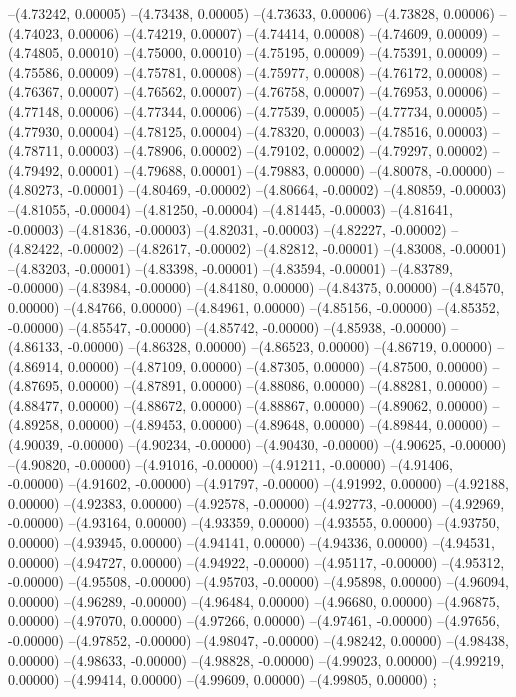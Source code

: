 --(4.73242, 0.00005)
--(4.73438, 0.00005)
--(4.73633, 0.00006)
--(4.73828, 0.00006)
--(4.74023, 0.00006)
--(4.74219, 0.00007)
--(4.74414, 0.00008)
--(4.74609, 0.00009)
--(4.74805, 0.00010)
--(4.75000, 0.00010)
--(4.75195, 0.00009)
--(4.75391, 0.00009)
--(4.75586, 0.00009)
--(4.75781, 0.00008)
--(4.75977, 0.00008)
--(4.76172, 0.00008)
--(4.76367, 0.00007)
--(4.76562, 0.00007)
--(4.76758, 0.00007)
--(4.76953, 0.00006)
--(4.77148, 0.00006)
--(4.77344, 0.00006)
--(4.77539, 0.00005)
--(4.77734, 0.00005)
--(4.77930, 0.00004)
--(4.78125, 0.00004)
--(4.78320, 0.00003)
--(4.78516, 0.00003)
--(4.78711, 0.00003)
--(4.78906, 0.00002)
--(4.79102, 0.00002)
--(4.79297, 0.00002)
--(4.79492, 0.00001)
--(4.79688, 0.00001)
--(4.79883, 0.00000)
--(4.80078, -0.00000)
--(4.80273, -0.00001)
--(4.80469, -0.00002)
--(4.80664, -0.00002)
--(4.80859, -0.00003)
--(4.81055, -0.00004)
--(4.81250, -0.00004)
--(4.81445, -0.00003)
--(4.81641, -0.00003)
--(4.81836, -0.00003)
--(4.82031, -0.00003)
--(4.82227, -0.00002)
--(4.82422, -0.00002)
--(4.82617, -0.00002)
--(4.82812, -0.00001)
--(4.83008, -0.00001)
--(4.83203, -0.00001)
--(4.83398, -0.00001)
--(4.83594, -0.00001)
--(4.83789, -0.00000)
--(4.83984, -0.00000)
--(4.84180, 0.00000)
--(4.84375, 0.00000)
--(4.84570, 0.00000)
--(4.84766, 0.00000)
--(4.84961, 0.00000)
--(4.85156, -0.00000)
--(4.85352, -0.00000)
--(4.85547, -0.00000)
--(4.85742, -0.00000)
--(4.85938, -0.00000)
--(4.86133, -0.00000)
--(4.86328, 0.00000)
--(4.86523, 0.00000)
--(4.86719, 0.00000)
--(4.86914, 0.00000)
--(4.87109, 0.00000)
--(4.87305, 0.00000)
--(4.87500, 0.00000)
--(4.87695, 0.00000)
--(4.87891, 0.00000)
--(4.88086, 0.00000)
--(4.88281, 0.00000)
--(4.88477, 0.00000)
--(4.88672, 0.00000)
--(4.88867, 0.00000)
--(4.89062, 0.00000)
--(4.89258, 0.00000)
--(4.89453, 0.00000)
--(4.89648, 0.00000)
--(4.89844, 0.00000)
--(4.90039, -0.00000)
--(4.90234, -0.00000)
--(4.90430, -0.00000)
--(4.90625, -0.00000)
--(4.90820, -0.00000)
--(4.91016, -0.00000)
--(4.91211, -0.00000)
--(4.91406, -0.00000)
--(4.91602, -0.00000)
--(4.91797, -0.00000)
--(4.91992, 0.00000)
--(4.92188, 0.00000)
--(4.92383, 0.00000)
--(4.92578, -0.00000)
--(4.92773, -0.00000)
--(4.92969, -0.00000)
--(4.93164, 0.00000)
--(4.93359, 0.00000)
--(4.93555, 0.00000)
--(4.93750, 0.00000)
--(4.93945, 0.00000)
--(4.94141, 0.00000)
--(4.94336, 0.00000)
--(4.94531, 0.00000)
--(4.94727, 0.00000)
--(4.94922, -0.00000)
--(4.95117, -0.00000)
--(4.95312, -0.00000)
--(4.95508, -0.00000)
--(4.95703, -0.00000)
--(4.95898, 0.00000)
--(4.96094, 0.00000)
--(4.96289, -0.00000)
--(4.96484, 0.00000)
--(4.96680, 0.00000)
--(4.96875, 0.00000)
--(4.97070, 0.00000)
--(4.97266, 0.00000)
--(4.97461, -0.00000)
--(4.97656, -0.00000)
--(4.97852, -0.00000)
--(4.98047, -0.00000)
--(4.98242, 0.00000)
--(4.98438, 0.00000)
--(4.98633, -0.00000)
--(4.98828, -0.00000)
--(4.99023, 0.00000)
--(4.99219, 0.00000)
--(4.99414, 0.00000)
--(4.99609, 0.00000)
--(4.99805, 0.00000)
;
